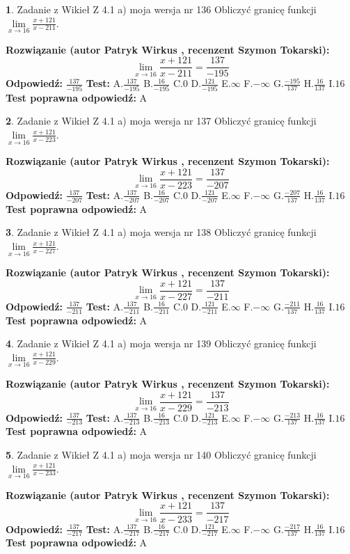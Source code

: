 \documentclass[12pt, a4paper]{article}
\theoremstyle{definition} %
\newtheorem{zad}{}
\newcommand{\zadStart}[1]{\begin{zad}#1\newline}
\newcommand{\zadStop}{\end{zad}}
\newcommand{\rozwStart}[2]{\noindent \textbf{Rozwiązanie (autor #1 , recenzent #2): }\newline}
\newcommand{\rozwStop}{\newline}
\newcommand{\odpStart}{\noindent \textbf{Odpowiedź:}\newline}
\newcommand{\odpStop}{\newline}
\newcommand{\testStart}{\noindent \textbf{Test:}\newline}
\newcommand{\testStop}{\newline}
\newcommand{\kluczStart}{\noindent \textbf{Test poprawna odpowiedź:}\newline}
\newcommand{\kluczStop}{\newline}
\begin{document}
\zadStart{Zadanie z Wikieł Z 4.1 a) moja wersja nr 136}
Obliczyć granicę funkcji $\lim\limits_{x\to16}\frac{x+121}{x-211}$.
\zadStop
\rozwStart{Patryk Wirkus}{Szymon Tokarski}
$$\lim\limits_{x\to16}\frac{x+121}{x-211} = \frac{137}{-195}$$
\rozwStop
\odpStart
$\frac{137}{-195}$
\odpStop
\testStart
A.$\frac{137}{-195}$
B.$\frac{16}{-195}$
C.$0$
D.$\frac{121}{-195}$
E.$\infty$
F.$-\infty$
G.$\frac{-195}{137}$
H.$\frac{16}{137}$
I.$16$
\testStop
\kluczStart
A
\kluczStop



\zadStart{Zadanie z Wikieł Z 4.1 a) moja wersja nr 137}
Obliczyć granicę funkcji $\lim\limits_{x\to16}\frac{x+121}{x-223}$.
\zadStop
\rozwStart{Patryk Wirkus}{Szymon Tokarski}
$$\lim\limits_{x\to16}\frac{x+121}{x-223} = \frac{137}{-207}$$
\rozwStop
\odpStart
$\frac{137}{-207}$
\odpStop
\testStart
A.$\frac{137}{-207}$
B.$\frac{16}{-207}$
C.$0$
D.$\frac{121}{-207}$
E.$\infty$
F.$-\infty$
G.$\frac{-207}{137}$
H.$\frac{16}{137}$
I.$16$
\testStop
\kluczStart
A
\kluczStop



\zadStart{Zadanie z Wikieł Z 4.1 a) moja wersja nr 138}
Obliczyć granicę funkcji $\lim\limits_{x\to16}\frac{x+121}{x-227}$.
\zadStop
\rozwStart{Patryk Wirkus}{Szymon Tokarski}
$$\lim\limits_{x\to16}\frac{x+121}{x-227} = \frac{137}{-211}$$
\rozwStop
\odpStart
$\frac{137}{-211}$
\odpStop
\testStart
A.$\frac{137}{-211}$
B.$\frac{16}{-211}$
C.$0$
D.$\frac{121}{-211}$
E.$\infty$
F.$-\infty$
G.$\frac{-211}{137}$
H.$\frac{16}{137}$
I.$16$
\testStop
\kluczStart
A
\kluczStop



\zadStart{Zadanie z Wikieł Z 4.1 a) moja wersja nr 139}
Obliczyć granicę funkcji $\lim\limits_{x\to16}\frac{x+121}{x-229}$.
\zadStop
\rozwStart{Patryk Wirkus}{Szymon Tokarski}
$$\lim\limits_{x\to16}\frac{x+121}{x-229} = \frac{137}{-213}$$
\rozwStop
\odpStart
$\frac{137}{-213}$
\odpStop
\testStart
A.$\frac{137}{-213}$
B.$\frac{16}{-213}$
C.$0$
D.$\frac{121}{-213}$
E.$\infty$
F.$-\infty$
G.$\frac{-213}{137}$
H.$\frac{16}{137}$
I.$16$
\testStop
\kluczStart
A
\kluczStop



\zadStart{Zadanie z Wikieł Z 4.1 a) moja wersja nr 140}
Obliczyć granicę funkcji $\lim\limits_{x\to16}\frac{x+121}{x-233}$.
\zadStop
\rozwStart{Patryk Wirkus}{Szymon Tokarski}
$$\lim\limits_{x\to16}\frac{x+121}{x-233} = \frac{137}{-217}$$
\rozwStop
\odpStart
$\frac{137}{-217}$
\odpStop
\testStart
A.$\frac{137}{-217}$
B.$\frac{16}{-217}$
C.$0$
D.$\frac{121}{-217}$
E.$\infty$
F.$-\infty$
G.$\frac{-217}{137}$
H.$\frac{16}{137}$
I.$16$
\testStop
\kluczStart
A
\kluczStop
\end{document}
